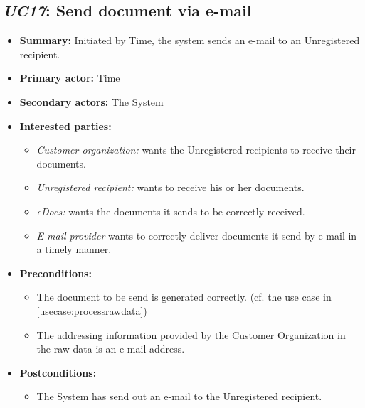 \documentclass[a4paper,10pt]{article}
\begin{document}
\subsection{\emph{UC17}: Send document via e-mail}
\label{usecase:senddocumentviaemail}
\begin{itemize}
    \item \textbf{Summary:} Initiated by Time, the system sends an e-mail to an Unregistered recipient.
    \item \textbf{Primary actor:} Time
	\item \textbf{Secondary actors:} The System
    \item \textbf{Interested parties:} 
        \begin{itemize}
            \item \textit{Customer organization:} wants the Unregistered recipients to receive their documents.
            \item \textit{Unregistered recipient:} wants to receive his or her documents.
            \item \textit{eDocs:} wants the documents it sends to be correctly received.
            \item \textit{E-mail provider} wants to correctly deliver documents it send by e-mail in a timely manner.
        \end{itemize}

    \item \textbf{Preconditions:}
        \begin{itemize}
            \item The document to be send is generated correctly. (cf. the use case in \ref{usecase:processrawdata})
            \item The addressing information provided by the Customer Organization in the raw data is an e-mail address.
        \end{itemize}

    \item \textbf{Postconditions:}
        \begin{itemize}
            \item The System has send out an e-mail to the Unregistered recipient.
        \end{itemize}
        

\end{itemize}
\end{document}
